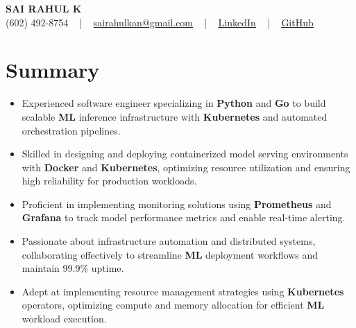 \documentclass[letterpaper,11pt]{article}
\newcommand{\resumeItem}[1]{
  \item\footnotesize{
    {#1 \vspace{-2pt}}
  }
}
\newcommand{\resumeItemListStart}{\begin{itemize}[leftmargin=*]}
\newcommand{\resumeItemListEnd}{\end{itemize}\vspace{-5pt}}
\begin{document}
\begin{center}
    {\fontsize{14pt}{12pt}\selectfont \textbf{\MakeUppercase{Sai Rahul K}}}\\ \vspace{2pt}
    \fontsize{10pt}{12pt}\selectfont (602) 492-8754 ~ | ~ \href{mailto:sairahulkan@gmail.com}{sairahulkan@gmail.com} ~ | ~
    \href{https://www.linkedin.com/in/rq123/}{\color{blue}\underline{LinkedIn}} ~ | ~
    \href{https://github.com/kanrahuldo}{\color{blue}\underline{GitHub}}~
    \vspace{-8pt}
\end{center}

\section{Summary}
\fontsize{9pt}{10pt}\selectfont
\resumeItemListStart
    \resumeItem{Experienced software engineer specializing in \textbf{Python} and \textbf{Go} to build scalable \textbf{ML} inference infrastructure with \textbf{Kubernetes} and automated orchestration pipelines.}
    \resumeItem{Skilled in designing and deploying containerized model serving environments with \textbf{Docker} and \textbf{Kubernetes}, optimizing resource utilization and ensuring high reliability for production workloads.}
    \resumeItem{Proficient in implementing monitoring solutions using \textbf{Prometheus} and \textbf{Grafana} to track model performance metrics and enable real-time alerting.}
    \resumeItem{Passionate about infrastructure automation and distributed systems, collaborating effectively to streamline \textbf{ML} deployment workflows and maintain 99.9\% uptime.}
    \resumeItem{Adept at implementing resource management strategies using \textbf{Kubernetes} operators, optimizing compute and memory allocation for efficient \textbf{ML} workload execution.}
\resumeItemListEnd
\vspace{-6pt}
\end{document}
